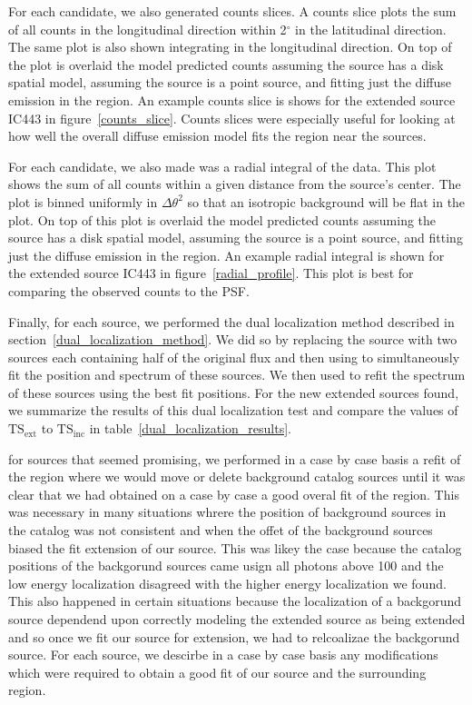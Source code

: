 \documentclass[12pt,preprint]{aastex}
\newcommand{\mev}{\text{MeV}\xspace}
\newcommand{\tsext}{{\ensuremath{\text{TS}_\text{ext}}}\xspace}
\newcommand{\tsinc}{\ensuremath{\text{TS}_\text{inc}}\xspace}
\renewcommand{\deg}{\ensuremath{^\circ}\xspace}
\newcommand{\pointlike}{\text{\em pointlike}\xspace}
\newcommand{\gtlike}{\text{\em gtlike}\xspace}
\begin{document}
For each candidate, we also generated counts slices. A counts slice
plots the sum of all counts in the longitudinal direction within 2\deg in
the latitudinal direction.  The same plot is also shown integrating in
the longitudinal direction.  On top of the plot is overlaid the model
predicted counts assuming the source has a disk spatial model, assuming
the source is a point source, and fitting just the diffuse emission in
the region.  An example counts slice is shows for the extended source
IC443 in figure~\ref{counts_slice}. Counts slices were especially useful
for looking at how well the overall diffuse emission model fits the region
near the sources.

For each candidate, we also made was a radial integral of the data. This
plot shows the sum of all counts within a given distance from the
source's center. The plot is binned uniformly in $\Delta \theta^2$ so
that an isotropic background will be flat in the plot. On top of this
plot is overlaid the model predicted counts assuming the source has a
disk spatial model, assuming the source is a point source, and fitting
just the diffuse emission in the region. An example radial integral
is shown for the extended source IC443 in figure~\ref{radial_profile}.
This plot is best for comparing the observed counts to the PSF.

Finally, for each source, we performed the dual localization method
described in section~\ref{dual_localization_method}.  We 
did so by replacing the source with two sources each containing
half of the original flux and then using \pointlike to
simultaneously fit the position and spectrum of these sources.
We then used \gtlike to refit the spectrum of these
sources using the best fit positions. For the
new extended sources found, we summarize the results of
this dual localization test and compare the values of \tsext
to \tsinc in table~\ref{dual_localization_results}.

for sources that seemed promising, we performed in a case
by case basis a refit of the region where we would move or delete
background catalog sources until it was clear that we had obtained on
a case by case a good overal fit of the region. This was necessary in
many situations whrere the position of background sources in the catalog
was not consistent and when the offet of the background sources biased
the fit extension of our source. This was likey the case because the
catalog positions of the backgorund sources came usign all photons above
100 \mev and the low energy localization disagreed with the higher energy
localization we found. This also happened in certain situations because
the localization of a backgorund source dependend upon correctly modeling
the extended source as being extended and so once we fit our source for
extension, we had to relcoalizae the backgorund source.  For each source,
we descirbe in a case by case basis any modifications which were required
to obtain a good fit of our source and the surrounding region.
\end{document}

